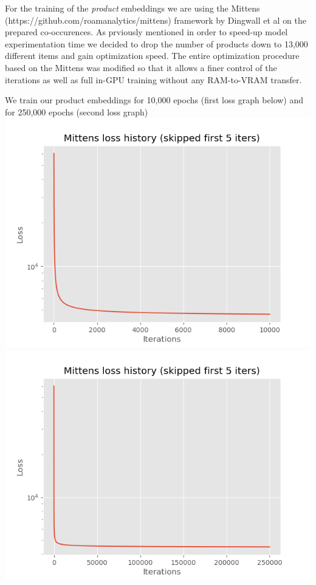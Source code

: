 \documentclass[11pt]{article}
\begin{document}
For the training of the \emph{product} embeddings we are using the
Mittens (https://github.com/roamanalytics/mittens) framework by Dingwall
et al \cite{dingwall2018mittens} on the prepared co-occurences. As
prviously mentioned in order to speed-up model experimentation time we
decided to drop the number of products down to 13,000 different items
and gain optimization speed. The entire optimization procedure based on
the Mittens \cite{dingwall2018mittens} was modified so that it allows a
finer control of the iterations as well as full in-GPU training without
any RAM-to-VRAM transfer.

We train our product embeddings for 10,000 epochs (first loss graph
below) and for 250,000 epochs (second loss graph)
\includegraphics{exp_v2_loss.png} \includegraphics{exp_v1_loss.png}
\end{document}
